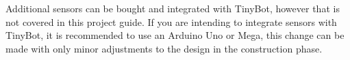 \documentclass[a4paper,12pt]{article}
\begin{document}

Additional sensors can be bought and integrated with TinyBot, however that is not covered in this project guide. If you are intending to integrate sensors with TinyBot, it is recommended to use an Arduino Uno or Mega, this change can be made with only minor adjustments to the design in the construction phase. \\



\end{document}
